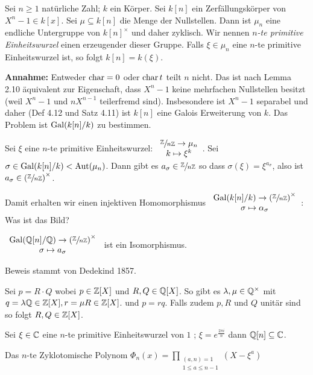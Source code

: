 Sei $n \geq 1$ natürliche Zahl; $k$ ein Körper. Sei $k[n]$ ein Zerfällungskörper von $X^{n}-1 \in k[x]$.
Sei $\mu \subseteq k[n]$ die Menge der Nullstellen. Dann ist $\mu_{n}$ eine endliche Untergruppe von $k[n]^{\times}$ 
und daher zyklisch. Wir nennen \emph{$n$-te primitive Einheitswurzel} einen erzeugender dieser Gruppe.
Falls $\xi \in \mu_{n}$ eine $n$-te primitive Einheitswurzel ist, so folgt $k[n] = k(\xi)$.

\textbf{Annahme:} Entweder $\operatorname{char} = 0$ oder $\operatorname{char} t$ teilt $n$ nicht.
Das ist nach Lemma 2.10 äquivalent zur Eigenschaft, dass $X^{n}-1$ keine mehrfachen Nullstellen besitzt (weil $X^{n}-1$ und $n X^{n-1}$ teilerfremd sind).
Insbesondere ist $X^{n}-1$ separabel und daher (Def 4.12 und Satz 4.11) ist $k[n]$ eine Galois Erweiterung von $k$.
Das Problem ist $\operatorname{Gal}(k[n] / k)$ zu bestimmen.

Sei $\xi$ eine $n $-te primitive Einheitswurzel: $\begin{array}{c} \sfrac{\mathbb{Z}}{n \mathbb{Z}} \to \mu_{n}\\ k \mapsto \xi^{k}\\ \end{array}$.
Sei $\sigma \in \operatorname{Gal}(k[n] / k) < \operatorname{Aut}(\mu_{n})$. Dann gibt es $a_{\sigma} \in \sfrac{\mathbb{Z}}{n \mathbb{Z}}$ 
so dass $\sigma(\xi) = \xi^{a_{\sigma}}$, also ist $a_{\sigma} \in \left( \sfrac{\mathbb{Z}}{n \mathbb{Z}} \right)^{\times}$.


Damit erhalten wir einen injektiven Homomorphismus $\begin{array}{c} \operatorname{Gal}(k[n] / k) \to \left( \sfrac{\mathbb{Z}}{n\mathbb{Z}} \right)^{\times}\\ \sigma \mapsto \alpha_{\sigma}\\ \end{array}$:
Was ist das Bild?

\begin{theorem}
	$\begin{array}{c} \operatorname{Gal}(\mathbb{Q}[n] / \mathbb{Q}) \to \left( \sfrac{\mathbb{Z}}{n \mathbb{Z}} \right)^{\times}\\ \sigma \mapsto a_{\sigma}\\ \end{array} $ ist ein Isomorphismus.
\end{theorem}

Beweis stammt von Dedekind 1857.

\begin{lemma}[Gauss]
	Sei $p = R \cdot Q$ wobei $p \in \mathbb{Z}[X]$ und $R,Q \in \mathbb{Q}[X]$. So gibt es $\lambda, \mu \in \mathbb{Q}^{\times}$ mit $q = \lambda \mathbb{Q} \in \mathbb{Z}[X], r = \mu R \in \mathbb{Z}[X]$.
	und $p = r q$. Falls zudem  $p, R$ und $Q$ unitär sind so folgt $R,Q \in \mathbb{Z}[X]$.
\end{lemma}



Sei $\xi \in \mathbb{C}$ eine $n$-te primitive Einheitswurzel von $1$ ; $\xi = e^{\frac{2\pi i}{n}}$ dann $\mathbb{Q}[n] \subseteq \mathbb{C}$.

\begin{definition}
	Das $n $-te Zyklotomische Polynom $\Phi_{n}(x) = \prod_{\substack{(a,n) = 1\\ 1 \leq a \leq n-1}} (X-\xi^{a})$
\end{definition}

